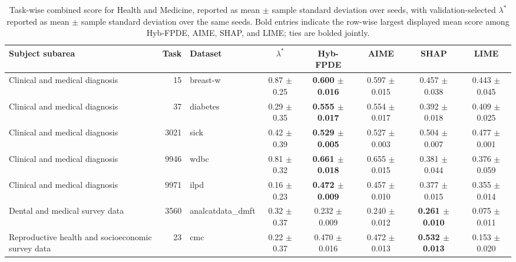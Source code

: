 \begin{table}[!tbp]
    \caption{Task-wise combined score for Health and Medicine, reported as mean $\pm$ sample standard deviation over seeds, with validation-selected $\lambda^*$ reported as mean $\pm$ sample standard deviation over the same seeds. Bold entries indicate the row-wise largest displayed mean score among Hyb-FPDE, AIME, SHAP, and LIME; ties are bolded jointly.}
    \label{tab:taskwise_combined_scores_sd_health_medicine}
    \centering
    \scriptsize
    \setlength{\tabcolsep}{3pt}
    \renewcommand{\arraystretch}{1.03}
    \begin{tabular}{lrlccccc}
        \toprule
        Subject subarea & Task & Dataset & $\lambda^*$ & Hyb-FPDE & AIME & SHAP & LIME  \\
        \midrule
        Clinical and medical diagnosis & 15 & breast-w & 0.87 $\pm$ 0.25 & \textbf{0.600 $\pm$ 0.016} & 0.597 $\pm$ 0.015 & 0.457 $\pm$ 0.038 & 0.443 $\pm$ 0.045 \\
        Clinical and medical diagnosis & 37 & diabetes & 0.29 $\pm$ 0.35 & \textbf{0.555 $\pm$ 0.017} & 0.554 $\pm$ 0.017 & 0.392 $\pm$ 0.018 & 0.409 $\pm$ 0.025 \\
        Clinical and medical diagnosis & 3021 & sick & 0.42 $\pm$ 0.39 & \textbf{0.529 $\pm$ 0.005} & 0.527 $\pm$ 0.003 & 0.504 $\pm$ 0.007 & 0.477 $\pm$ 0.001 \\
        Clinical and medical diagnosis & 9946 & wdbc & 0.81 $\pm$ 0.32 & \textbf{0.661 $\pm$ 0.018} & 0.655 $\pm$ 0.015 & 0.381 $\pm$ 0.044 & 0.376 $\pm$ 0.059 \\
        Clinical and medical diagnosis & 9971 & ilpd & 0.16 $\pm$ 0.23 & \textbf{0.472 $\pm$ 0.009} & 0.457 $\pm$ 0.010 & 0.377 $\pm$ 0.015 & 0.355 $\pm$ 0.014 \\
        Dental and medical survey data & 3560 & analcatdata\_dmft & 0.32 $\pm$ 0.37 & 0.232 $\pm$ 0.009 & 0.240 $\pm$ 0.012 & \textbf{0.261 $\pm$ 0.010} & 0.075 $\pm$ 0.011 \\
        Reproductive health and socioeconomic survey data & 23 & cmc & 0.22 $\pm$ 0.37 & 0.470 $\pm$ 0.016 & 0.472 $\pm$ 0.013 & \textbf{0.532 $\pm$ 0.013} & 0.153 $\pm$ 0.020 \\
        \bottomrule
    \end{tabular}%
\end{table}

